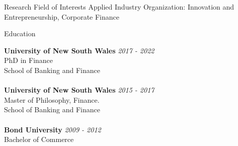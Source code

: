\documentclass{resume} %
\begin{document}

\begin{rSection}{Research Field of Interests}
	Applied Industry Organization: Innovation and Entrepreneurship, Corporate Finance

\end{rSection}
\begin{rSection}{Education}

	{\bf University of New South Wales} \hfill {\em 2017 - 2022}
	\\ PhD in Finance
	\\ School of Banking and Finance\\
	\\{\bf University of New South Wales} \hfill {\em 2015 - 2017}
	\\ Master of Philosophy, Finance.
	\\ School of Banking and Finance
	\\
	\\{\bf Bond University} \hfill {\em 2009 - 2012}
	\\ Bachelor of Commerce
\end{rSection}
\end{document}
